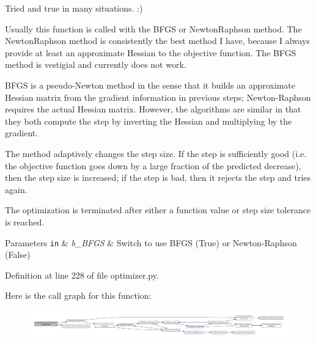 Tried and true in many situations. \-:) \begin{DoxyVerb}   Usually this function is called with the BFGS or NewtonRaphson
   method.  The NewtonRaphson method is consistently the best
   method I have, because I always provide at least an
   approximate Hessian to the objective function.  The BFGS
   method is vestigial and currently does not work.

   BFGS is a pseudo-Newton method in the sense that it builds an
   approximate Hessian matrix from the gradient information in previous
   steps; Newton-Raphson requires the actual Hessian matrix.
   However, the algorithms are similar in that they both compute the
   step by inverting the Hessian and multiplying by the gradient.

   The method adaptively changes the step size.  If the step is
   sufficiently good (i.e. the objective function goes down by a
   large fraction of the predicted decrease), then the step size
   is increased; if the step is bad, then it rejects the step and
   tries again.

   The optimization is terminated after either a function value or
   step size tolerance is reached.
\end{DoxyVerb}



\begin{DoxyParams}[1]{Parameters}
\mbox{\tt in}  & {\em b\-\_\-\-B\-F\-G\-S} & Switch to use B\-F\-G\-S (True) or Newton-\/\-Raphson (False) \\
\hline
\end{DoxyParams}


Definition at line 228 of file optimizer.\-py.



Here is the call graph for this function\-:
\nopagebreak
\begin{figure}[H]
\begin{center}
\leavevmode
\includegraphics[width=350pt]{classforcebalance_1_1optimizer_1_1Optimizer_a1d222f82239075ea0d6b9294b2f50e12_cgraph}
\end{center}
\end{figure}


